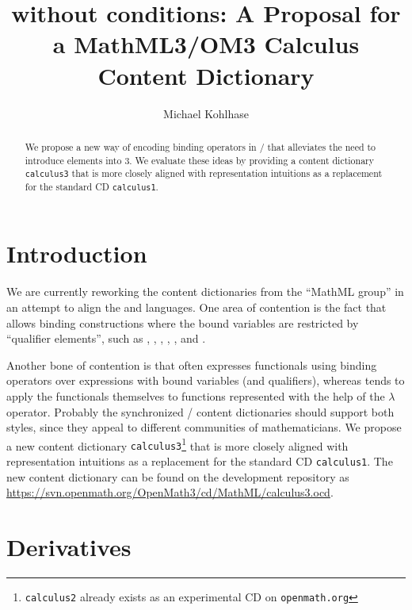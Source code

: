 \documentclass[12pt]{article}
\title{{\openmath3} without conditions: A Proposal for a MathML3/OM3 Calculus Content Dictionary}
\author{Michael Kohlhase}
\begin{document}
\maketitle
\begin{abstract}
  We propose a new way of encoding binding operators in {\openmath/\mathml} that
  alleviates the need to introduce {} elements into {\openmath}3. We
  evaluate these ideas by providing a content dictionary {\texttt{calculus3}} that is more
  closely aligned with {} representation intuitions as a replacement for the
  {\openmath} standard CD {\texttt{calculus1}}.
\end{abstract}

\section{Introduction}
We are currently reworking the {\openmath} content dictionaries from the ``MathML group''
in an attempt to align the {} and {} languages. One area of contention
is the fact that {\mathml} allows binding constructions where the bound variables are
restricted by ``qualifier elements'', such as {},
{}, {}, {}, {}, and
{}.

Another bone of contention is that {\mathml} often expresses functionals using binding
operators over expressions with bound variables (and qualifiers), whereas {\openmath}
tends to apply the functionals themselves to functions represented with the help of the
$\lambda$ operator. Probably the synchronized {}/{} content dictionaries
should support both styles, since they appeal to different communities of
mathematicians. We propose a new content dictionary
{\texttt{calculus3}}\footnote{{\texttt{calculus2}} already exists as an experimental CD on
  {\texttt{openmath.org}}} that is more closely aligned with {} representation
intuitions as a replacement for the {\openmath} standard CD {\texttt{calculus1}}. The new
content dictionary can be found on the {} development repository as
{\url{https://svn.openmath.org/OpenMath3/cd/MathML/calculus3.ocd}}.

\section{Derivatives}
\end{document}

